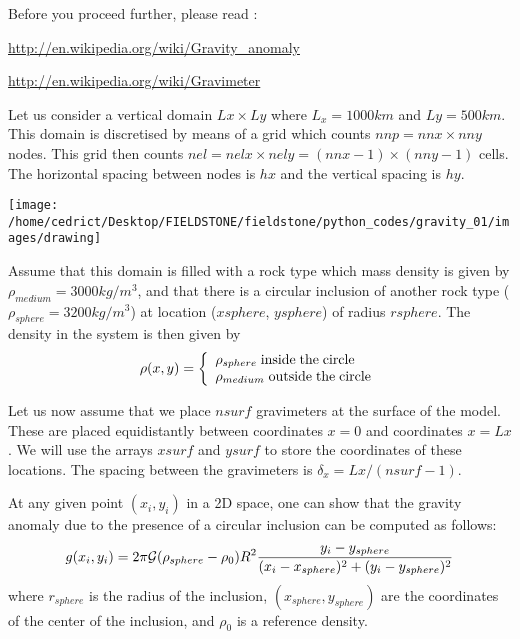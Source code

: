 Before you proceed further, please read :

\url{http://en.wikipedia.org/wiki/Gravity_anomaly}

\url{http://en.wikipedia.org/wiki/Gravimeter}

Let us consider a vertical domain $Lx \times Ly$ where $L_x=1000km$
and $Ly=500km$. This domain is discretised by means of a grid which counts $nnp= nnx \times nny$ nodes.
This grid then counts $nel=nelx \times nely = (nnx-1)\times(nny-1)$ cells.
The horizontal spacing between nodes is $hx$ and the vertical spacing is $hy$.

\begin{center}
\texttt{[image: /home/cedrict/Desktop/FIELDSTONE/fieldstone/python\_codes/gravity\_01/images/drawing]}
\end{center}

Assume that this domain is filled with a rock type which 
mass density is given by $\rho_{medium}=3000kg/m^3$, 
and that there is a circular inclusion of another rock type  ($\rho_{sphere}=3200kg/m^3$) 
at location ($xsphere$, $ysphere$) of radius $rsphere$.
The density in the system is then given by 
\[
\rho(x,y) = 
\left\{
\begin{array}{l}
\rho_{sphere} \; {\rm  inside \; the\; circle} \\
\rho_{medium} \; {\rm outside \; the\; circle}
\end{array}
\right.
\]

Let us now assume that we place $nsurf$ gravimeters at the surface of the model. These are placed 
equidistantly between coordinates $x=0$ and coordinates $x=Lx$. We will use the arrays $xsurf$ and $ysurf$
to store the coordinates of these locations. 
The spacing between the gravimeters is $\delta_x=Lx/(nsurf-1)$.

At any given point $(x_i,y_i)$ in a 2D space, one can show that 
the gravity anomaly due to the presence of a 
circular inclusion can be computed as follows:
\begin{equation}
g(x_i,y_i)={2 \pi {\cal G} (\rho_{sphere}-\rho_0) R^2}\frac{y_i-y_{sphere}}{(x_i-x_{sphere})^2+(y_i-y_{sphere})^2}
\end{equation}
where $r_{sphere}$ is the radius of the inclusion, $(x_{sphere},y_{sphere})$ 
are the coordinates of the center of the inclusion, and
$\rho_0$ is a reference density.

